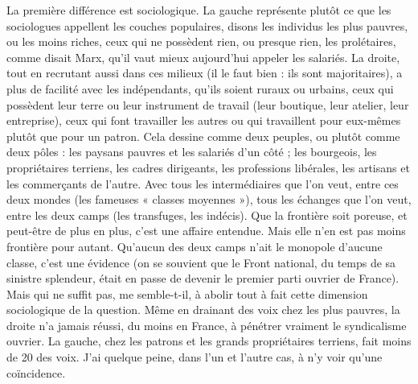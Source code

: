 La première différence est sociologique. La gauche représente plutôt ce que
les sociologues appellent les couches populaires, disons les individus les plus
pauvres, ou les moins riches, ceux qui ne possèdent rien, ou presque rien, les
prolétaires, comme disait Marx, qu’il vaut mieux aujourd’hui appeler les salariés.
La droite, tout en recrutant aussi dans ces milieux (il le faut bien : ils sont
majoritaires), a plus de facilité avec les indépendants, qu’ils soient ruraux ou
urbains, ceux qui possèdent leur terre ou leur instrument de travail (leur boutique,
leur atelier, leur entreprise), ceux qui font travailler les autres ou qui
travaillent pour eux-mêmes plutôt que pour un patron. Cela dessine comme
deux peuples, ou plutôt comme deux pôles : les paysans pauvres et les salariés
d’un côté ; les bourgeois, les propriétaires terriens, les cadres dirigeants, les professions
libérales, les artisans et les commerçants de l’autre. Avec tous les intermédiaires
que l’on veut, entre ces deux mondes (les fameuses « classes
moyennes »), tous les échanges que l’on veut, entre les deux camps (les transfuges,
les indécis). Que la frontière soit poreuse, et peut-être de plus en plus,
c’est une affaire entendue. Mais elle n’en est pas moins frontière pour autant.
Qu’aucun des deux camps n’ait le monopole d’aucune classe, c’est une évidence
(on se souvient que le Front national, du temps de sa sinistre splendeur,
était en passe de devenir le premier parti ouvrier de France). Mais qui ne suffit
pas, me semble-t-il, à abolir tout à fait cette dimension sociologique de la question.
Même en drainant des voix chez les plus pauvres, la droite n’a jamais
réussi, du moins en France, à pénétrer vraiment le syndicalisme ouvrier. La
gauche, chez les patrons et les grands propriétaires terriens, fait moins de 20 %
des voix. J'ai quelque peine, dans l’un et l’autre cas, à n’y voir qu’une coïncidence.


